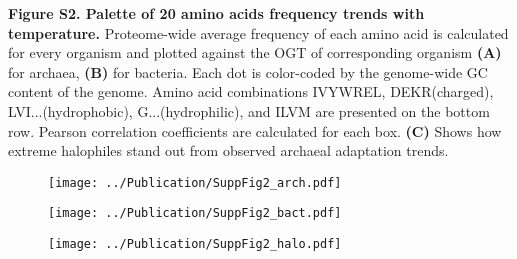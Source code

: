 \documentclass{report}
\begin{document}
{\bf Figure S2. Palette of 20 amino acids frequency trends with temperature.} Proteome-wide average frequency of each amino acid is calculated for every organism and plotted against the OGT of corresponding organism {\bf(A)} for archaea, {\bf(B)} for bacteria. Each dot is color-coded by the genome-wide GC content of the genome. Amino acid combinations IVYWREL, DEKR(charged), LVI...(hydrophobic), G...(hydrophilic), and ILVM are presented on the bottom row. Pearson correlation coefficients are calculated for each box.  {\bf(C)} Shows how extreme halophiles stand out from observed archaeal adaptation trends.


\begin{figure}[b!]
	\centering
	\texttt{[image: ../Publication/SuppFig2\_arch.pdf]}
\end{figure}


\begin{figure}[b!]
	\centering
	\texttt{[image: ../Publication/SuppFig2\_bact.pdf]}
\end{figure}


\begin{figure}[b!]
	\centering
	\texttt{[image: ../Publication/SuppFig2\_halo.pdf]}
\end{figure}
\end{document}
